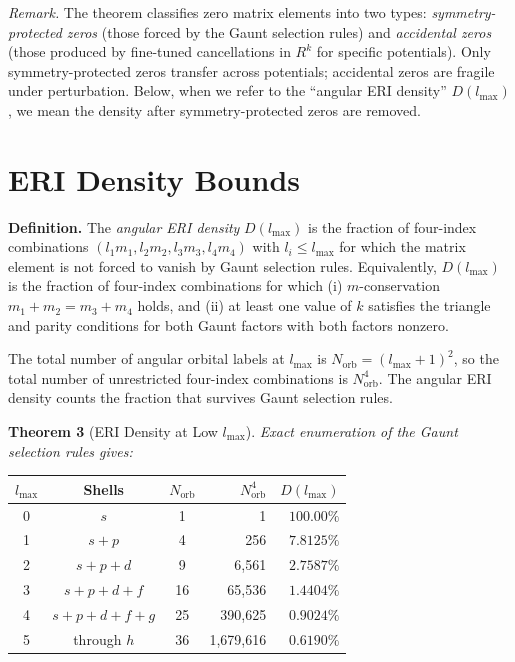 \documentclass[twocolumn,pra,amsmath,amssymb,superscriptaddress]{revtex4-2}
\begin{document}
\textit{Remark.}  The theorem classifies zero matrix elements into
two types: \emph{symmetry-protected zeros} (those forced by the
Gaunt selection rules) and \emph{accidental zeros} (those produced
by fine-tuned cancellations in $R^k$ for specific potentials).  Only
symmetry-protected zeros transfer across potentials; accidental
zeros are fragile under perturbation.  Below, when we refer to the
``angular ERI density'' $D(l_{\max})$, we mean the density after
symmetry-protected zeros are removed.

\section{ERI Density Bounds}
\label{sec:bounds}

\noindent\textbf{Definition.}  The \textit{angular ERI density}
$D(l_{\max})$ is the fraction of four-index combinations
$(l_1 m_1, l_2 m_2, l_3 m_3, l_4 m_4)$ with $l_i \leq l_{\max}$
for which the matrix element is not forced to vanish by Gaunt
selection rules.  Equivalently, $D(l_{\max})$ is the fraction of
four-index combinations for which (i) $m$-conservation
$m_1 + m_2 = m_3 + m_4$ holds, and (ii) at least one value of $k$
satisfies the triangle and parity conditions for both Gaunt factors
with both factors nonzero.

The total number of angular orbital labels at $l_{\max}$ is
$N_{\mathrm{orb}} = (l_{\max} + 1)^2$, so the total number of
unrestricted four-index combinations is $N_{\mathrm{orb}}^4$.  The
angular ERI density counts the fraction that survives Gaunt
selection rules.

\medskip
\noindent\textbf{Theorem 3} (ERI Density at Low $l_{\max}$).
\textit{Exact enumeration of the Gaunt selection rules gives:}

\begin{center}
\begin{tabular}{cccrr}
\toprule
$l_{\max}$ & Shells & $N_{\mathrm{orb}}$ & $N_{\mathrm{orb}}^4$ & $D(l_{\max})$ \\
\midrule
0 & $s$                 & 1  &           1 & $100.00\%$ \\
1 & $s + p$             & 4  &         256 & $7.8125\%$ \\
2 & $s + p + d$         & 9  &       6{,}561 & $2.7587\%$ \\
3 & $s + p + d + f$     & 16 &      65{,}536 & $1.4404\%$ \\
4 & $s + p + d + f + g$ & 25 &     390{,}625 & $0.9024\%$ \\
5 & through $h$         & 36 &   1{,}679{,}616 & $0.6190\%$ \\
\bottomrule
\end{tabular}
\end{center}
\end{document}
